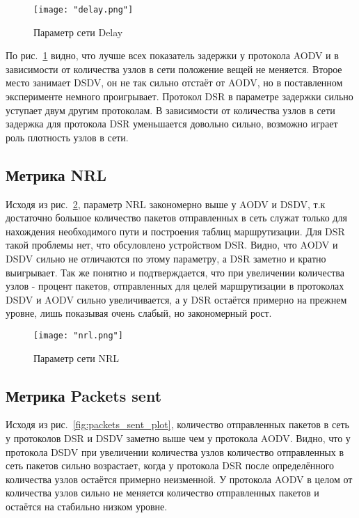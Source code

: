 \begin{figure}[!h]
    \centering
    \texttt{[image: "delay.png"]}
    \caption{Параметр сети Delay}
    \label{fig:delay_plot}
\end{figure}

По рис.~\ref{fig:delay_plot} видно, что лучше всех показатель задержки у протокола AODV и в зависимости от количества узлов в сети положение вещей не меняется. Второе место занимает DSDV, он не так сильно отстаёт от AODV, но в поставленном эксперименте немного проигрывает. Протокол DSR в параметре задержки сильно уступает двум другим протоколам. В зависимости от количества узлов в сети задержка для протокола DSR уменьшается довольно сильно, возможно играет роль плотность узлов в сети.
  

\subsection*{Метрика NRL}

Исходя из рис.~\ref{fig:nrl_plot}, параметр NRL закономерно выше у AODV и DSDV, т.к достаточно большое количество пакетов отправленных в сеть служат только для нахождения необходимого пути и построения таблиц маршрутизации. Для DSR такой проблемы нет, что обсуловлено устройством DSR. Видно, что AODV и DSDV сильно не отличаются по этому параметру, а DSR заметно и кратно выигрывает. Так же понятно и подтверждается, что при увеличении количества узлов - процент пакетов, отправленных для целей маршрутизации в протоколах DSDV и AODV сильно увеличивается, а у DSR остаётся примерно на прежнем уровне, лишь показывая очень слабый, но закономерный рост.

\begin{figure}[!h]
    \centering
    \texttt{[image: "nrl.png"]}
    \caption{Параметр сети NRL}
    \label{fig:nrl_plot}
\end{figure}

\subsection*{Метрика Packets sent}

Исходя из рис.~\ref{fig:packets_sent_plot}, количество отправленных пакетов в сеть у протоколов DSR и DSDV заметно выше чем у протокола AODV. Видно, что у протокола DSDV при увеличении количества узлов количество отправленных в сеть пакетов сильно возрастает, когда у протокола DSR после определённого количества узлов остаётся примерно неизменной. У протокола AODV в целом от количества узлов сильно не меняется количество отправленных пакетов и остаётся на стабильно низком уровне.

